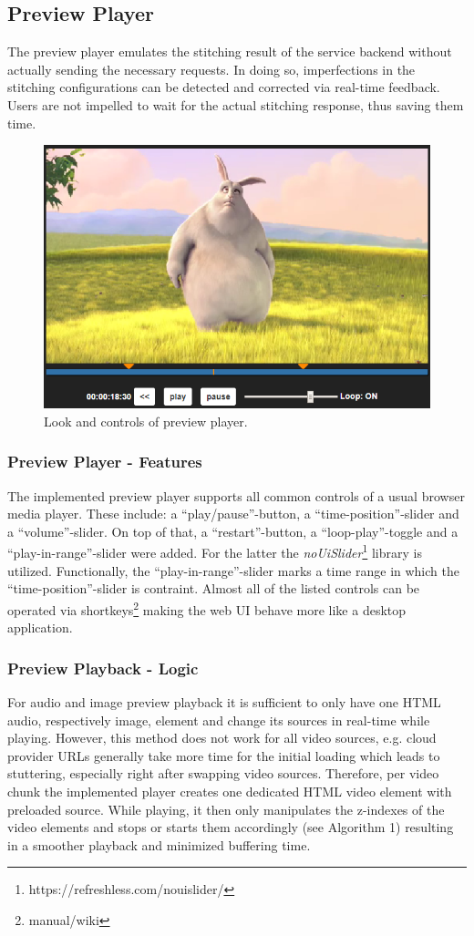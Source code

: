 \documentclass[conference]{IEEEtran}
\begin{document}
\subsection{Preview Player}
The preview player emulates the stitching result of the service backend without actually sending the necessary requests.
In doing so, imperfections in the stitching configurations can be detected and corrected via real-time feedback.
Users are not impelled to wait for the actual stitching response, thus saving them time.
\begin{figure}[H]
\centering
\includegraphics[scale=0.5]{preview_player.png}
\caption{Look and controls of preview player.}
\end{figure}
\subsubsection{Preview Player - Features}
The implemented preview player supports all common controls of a usual browser media player.
These include: a ``play/pause''-button, a ``time-position''-slider and a ``volume''-slider.
On top of that, a ``restart''-button, a ``loop-play''-toggle and a ``play-in-range''-slider were added.
For the latter the \textit{noUiSlider}\footnote{https://refreshless.com/nouislider/} library is utilized.
Functionally, the ``play-in-range''-slider marks a time range in which the ``time-position''-slider is contraint.
Almost all of the listed controls can be operated via shortkeys\footnote{manual/wiki} making the web UI behave more like a desktop application.
\\
\subsubsection{Preview Playback - Logic}
For audio and image preview playback it is sufficient to only have one HTML audio, respectively image, element and change its sources in real-time while playing.
However, this method does not work for all video sources, e.g. cloud provider URLs generally take more time for the initial loading which leads to stuttering, especially right after swapping video sources.
Therefore, per video chunk the implemented player creates one dedicated HTML video element with preloaded source.
While playing, it then only manipulates the z-indexes of the video elements and stops or starts them accordingly (see Algorithm 1) resulting in a smoother playback and minimized buffering time.
\end{document}
